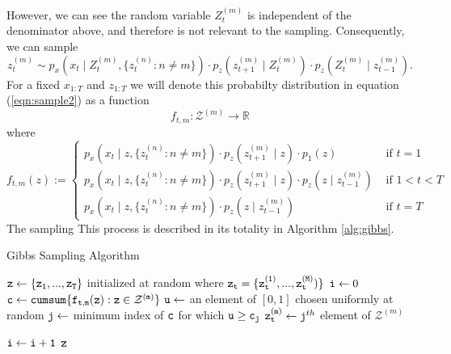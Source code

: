 \documentclass{amsart}
\begin{document}
However, we can see the random variable $Z_t^{(m)}$ is independent of the 
denominator above, and therefore is not 
relevant to the sampling. Consequently, we can sample 
\begin{equation}\label{eqn:sample2}
z_t^{(m)}\sim p_x(x_t\mid Z_t^{(m)},\{z_t^{(n)}:n\neq m\})\cdot
p_z(z_{t+1}^{(m)}\mid Z_t^{(m)})\cdot
p_z(Z_t^{(m)}\mid z_{t-1}^{(m)}).
\end{equation}
For a fixed $x_{1:T}$ and $z_{1:T}$ we will denote this probabilty distribution 
in equation (\ref{eqn:sample2}) as a function 
\[
f_{t,m}:\mathcal Z^{(m)}\rightarrow \mathbb{R}
\]
where 
\[
f_{t,m}(z) := \begin{cases}
p_x(x_t\mid z,\{z_t^{(n)}:n\neq m\})\cdot
p_z(z_{t+1}^{(m)}\mid z)\cdot
p_1(z)& \text{ if }t=1\\
p_x(x_t\mid z,\{z_t^{(n)}:n\neq m\})\cdot
p_z(z_{t+1}^{(m)}\mid z)\cdot
p_z(z\mid z_{t-1}^{(m)})& \text{ if }1<t<T\\
p_x(x_t\mid z,\{z_t^{(n)}:n\neq m\})\cdot
p_z(z\mid z_{t-1}^{(m)})& \text{ if }t=T
\end{cases}
\]
The sampling This process is described in its totality in Algorithm \ref{alg:gibbs}.  


\begin{algorithm}
  \caption{Gibbs Sampling Algorithm\label{alg:gibbs}}
  \begin{algorithmic}[1]
    \State $\tt{z}\leftarrow \{z_1,...,z_T\}$ initialized at random where 
    $\tt{z}_t=\{z_t^{(1)},...,z_t^{(M)})\}$
    \State ${\tt i}\leftarrow 0$
        \State ${\tt c} \leftarrow {\tt cumsum \{f_{t,m}(z):z\in \mathcal 
        Z^{(m)}\}}$ 
        \label{eqn:alg_prob}
        \State ${\tt u}\leftarrow$ an element of $[0,1]$ chosen uniformly at 
        random
        \State ${\tt j}\leftarrow$ minimum index of ${\tt c}$ for which 
        $\tt{u}\geq c_j$
        \State ${\tt z_t^{(m)}}\leftarrow {\tt j}^{th}$ element of $\mathcal Z^{(m)}$

      \EndFor
      \State ${\tt i}\leftarrow {\tt i+1}$
      \EndWhile
      \State\Return ${\tt z}$
    \EndFunction
  \end{algorithmic}
\end{algorithm}
\end{document}
